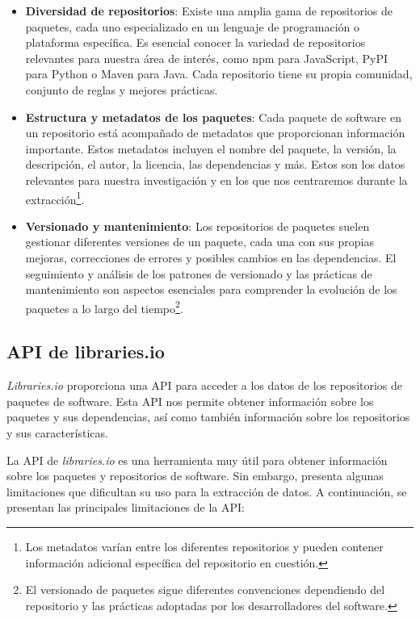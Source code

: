 \begin{itemize}
    \item \textbf{Diversidad de repositorios}: Existe una amplia gama de repositorios de paquetes,
          cada uno especializado en un lenguaje de programación o plataforma específica. Es esencial
          conocer la variedad de repositorios relevantes para nuestra área de interés, como npm para JavaScript,
          PyPI para Python o Maven para Java. Cada repositorio tiene su propia comunidad, conjunto de reglas
          y mejores prácticas.
    \item \textbf{Estructura y metadatos de los paquetes}: Cada paquete de software en un repositorio
          está acompañado de metadatos que proporcionan información importante. Estos metadatos incluyen el
          nombre del paquete, la versión, la descripción, el autor, la licencia, las dependencias y más.
          Estos son los datos relevantes para nuestra investigación y en los que nos centraremos durante
          la extracción\footnote{Los metadatos varían entre los diferentes repositorios y pueden contener
              información adicional específica del repositorio en cuestión.}.
    \item \textbf{Versionado y mantenimiento}: Los repositorios de paquetes suelen gestionar diferentes
          versiones de un paquete, cada una con sus propias mejoras, correcciones de errores y posibles cambios
          en las dependencias. El seguimiento y análisis de los patrones de versionado y las prácticas de
          mantenimiento son aspectos esenciales para comprender la evolución de los paquetes a lo largo del
          tiempo\footnote{El versionado de paquetes sigue diferentes convenciones dependiendo del repositorio
              y las prácticas adoptadas por los desarrolladores del software.}.
\end{itemize}

\subsection{API de libraries.io}

\textit{Libraries.io} proporciona una API para acceder a los datos de los repositorios de paquetes
de software. Esta API nos permite obtener información sobre los paquetes y sus dependencias,
así como también información sobre los repositorios y sus características.

La API de \textit{libraries.io} es una herramienta muy útil para obtener información sobre los
paquetes y repositorios de software. Sin embargo, presenta algunas limitaciones que dificultan
su uso para la extracción de datos. A continuación, se presentan las principales limitaciones
de la API:

